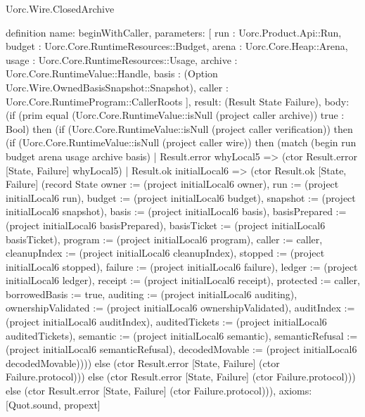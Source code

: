\begin{lexlean}{Uorc.Wire.ClosedArchive}
\begin{semanticmodule}
definition{
  name: beginWithCaller,
  parameters: [
    run : Uorc.Product.Api::Run,
    budget : Uorc.Core.RuntimeResources::Budget,
    arena : Uorc.Core.Heap::Arena,
    usage : Uorc.Core.RuntimeResources::Usage,
    archive : Uorc.Core.RuntimeValue::Handle,
    basis : (Option Uorc.Wire.OwnedBasisSnapshot::Snapshot),
    caller : Uorc.Core.RuntimeProgram::CallerRoots
  ],
  result: (Result State Failure),
  body: (if (prim equal (Uorc.Core.RuntimeValue::isNull (project caller archive)) true : Bool) then (if (Uorc.Core.RuntimeValue::isNull (project caller verification)) then (if (Uorc.Core.RuntimeValue::isNull (project caller wire)) then (match (begin run budget arena usage archive basis)
    | Result.error whyLocal5 => (ctor Result.error [State, Failure] whyLocal5)
    | Result.ok initialLocal6 => (ctor Result.ok [State, Failure] (record State {owner := (project initialLocal6 owner), run := (project initialLocal6 run), budget := (project initialLocal6 budget), snapshot := (project initialLocal6 snapshot), basis := (project initialLocal6 basis), basisPrepared := (project initialLocal6 basisPrepared), basisTicket := (project initialLocal6 basisTicket), program := (project initialLocal6 program), caller := caller, cleanupIndex := (project initialLocal6 cleanupIndex), stopped := (project initialLocal6 stopped), failure := (project initialLocal6 failure), ledger := (project initialLocal6 ledger), receipt := (project initialLocal6 receipt), protected := caller, borrowedBasis := true, auditing := (project initialLocal6 auditing), ownershipValidated := (project initialLocal6 ownershipValidated), auditIndex := (project initialLocal6 auditIndex), auditedTickets := (project initialLocal6 auditedTickets), semantic := (project initialLocal6 semantic), semanticRefusal := (project initialLocal6 semanticRefusal), decodedMovable := (project initialLocal6 decodedMovable)}))) else (ctor Result.error [State, Failure] (ctor Failure.protocol))) else (ctor Result.error [State, Failure] (ctor Failure.protocol))) else (ctor Result.error [State, Failure] (ctor Failure.protocol))),
  axioms: [Quot.sound, propext]
}


\end{semanticmodule}
\end{lexlean}

